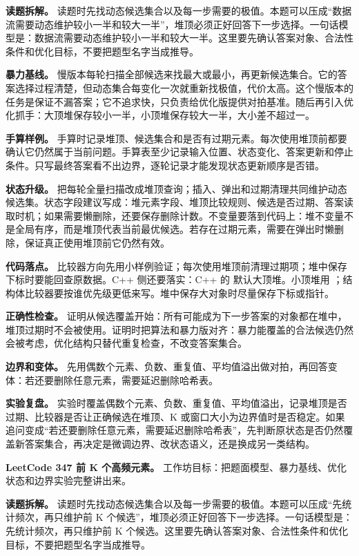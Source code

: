 \textbf{读题拆解。} 读题时先找动态候选集合以及每一步需要的极值。本题可以压成“数据流需要动态维护较小一半和较大一半”，堆顶必须正好回答下一步选择。一句话模型是：数据流需要动态维护较小一半和较大一半。这里要先确认答案对象、合法性条件和优化目标，不要把题型名字当成推导。

\textbf{暴力基线。} 慢版本每轮扫描全部候选来找最大或最小，再更新候选集合。它的答案选择过程清楚，但动态集合每变化一次就重新找极值，代价太高。这个慢版本的任务是保证不漏答案；它不追求快，只负责给优化版提供对拍基准。随后再引入优化抓手：大顶堆保存较小一半，小顶堆保存较大一半，大小差不超过一。

\textbf{手算样例。} 手算时记录堆顶、候选集合和是否有过期元素。每次使用堆顶前都要确认它仍然属于当前问题。手算表至少记录输入位置、状态变化、答案更新和停止条件。只写最终答案看不出边界，逐轮记录才能发现状态更新顺序是否错。

\textbf{状态升级。} 把每轮全量扫描改成堆顶查询；插入、弹出和过期清理共同维护动态候选集。状态字段建议写成：堆元素字段、堆顶比较规则、候选是否过期、答案读取时机；如果需要懒删除，还要保存删除计数。不变量要落到代码上：堆不变量不是全局有序，而是堆顶代表当前最优候选。若存在过期元素，需要在弹出时懒删除，保证真正使用堆顶前它仍然有效。

\textbf{代码落点。} 比较器方向先用小样例验证；每次使用堆顶前清理过期项；堆中保存下标时要能回查原数据。C++ 侧还要落实：C++ 的  默认大顶堆。小顶堆用 ；结构体比较器要按谁优先级更低来写。堆中保存大对象时尽量保存下标或指针。

\textbf{正确性检查。} 证明从候选覆盖开始：所有可能成为下一步答案的对象都在堆中，堆顶过期时不会被使用。证明时把算法和暴力版对齐：暴力能覆盖的合法候选仍然会被考虑，优化结构只替代重复检查，不改变答案集合。

\textbf{边界和变体。} 先用偶数个元素、负数、重复值、平均值溢出做对拍，再回答变体：若还要删除任意元素，需要延迟删除哈希表。

\textbf{实验复盘。} 实验时覆盖偶数个元素、负数、重复值、平均值溢出，记录堆顶是否过期、比较器是否让正确候选在堆顶、K 或窗口大小为边界值时是否稳定。如果追问变成“若还要删除任意元素，需要延迟删除哈希表”，先判断原状态是否仍然覆盖新答案集合，再决定是微调边界、改状态语义，还是换成另一类结构。

\noindent\textbf{LeetCode 347 前 K 个高频元素。} 工作坊目标：把题面模型、暴力基线、优化状态和边界实验完整讲出来。

\textbf{读题拆解。} 读题时先找动态候选集合以及每一步需要的极值。本题可以压成“先统计频次，再只维护前 K 个候选”，堆顶必须正好回答下一步选择。一句话模型是：先统计频次，再只维护前 K 个候选。这里要先确认答案对象、合法性条件和优化目标，不要把题型名字当成推导。

